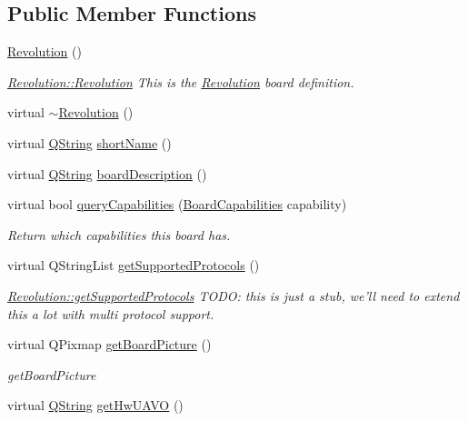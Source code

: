 \subsection*{Public Member Functions}
\begin{DoxyCompactItemize}
\item 
\hyperlink{group___boards___open_pilot_plugin_gad4ecc2008e08f7c54b4fe92215c77bbb}{Revolution} ()
\begin{DoxyCompactList}\small\item\em \hyperlink{group___boards___open_pilot_plugin_gad4ecc2008e08f7c54b4fe92215c77bbb}{Revolution\-::\-Revolution} This is the \hyperlink{class_revolution}{Revolution} board definition. \end{DoxyCompactList}\item 
virtual \hyperlink{group___boards___open_pilot_plugin_ga231a5a6f79ce02a7e05009982fb65d15}{$\sim$\-Revolution} ()
\item 
virtual \hyperlink{group___u_a_v_objects_plugin_gab9d252f49c333c94a72f97ce3105a32d}{Q\-String} \hyperlink{group___boards___open_pilot_plugin_gad4cc3e213b15f56ace6281fe55d94f32}{short\-Name} ()
\item 
virtual \hyperlink{group___u_a_v_objects_plugin_gab9d252f49c333c94a72f97ce3105a32d}{Q\-String} \hyperlink{group___boards___open_pilot_plugin_ga8f2a18257adeeb2cd190e4150cf5cc01}{board\-Description} ()
\item 
virtual bool \hyperlink{group___boards___open_pilot_plugin_gaef49c9e5a2cbbcbce7b6e7ed3867adaf}{query\-Capabilities} (\hyperlink{group___core_plugin_ga01b09218f2a13aaeee6db007ac6bd967}{Board\-Capabilities} capability)
\begin{DoxyCompactList}\small\item\em Return which capabilities this board has. \end{DoxyCompactList}\item 
virtual Q\-String\-List \hyperlink{group___boards___open_pilot_plugin_gaec390e1462c61b4e0d3b433f35159192}{get\-Supported\-Protocols} ()
\begin{DoxyCompactList}\small\item\em \hyperlink{group___boards___open_pilot_plugin_gaec390e1462c61b4e0d3b433f35159192}{Revolution\-::get\-Supported\-Protocols} T\-O\-D\-O\-: this is just a stub, we'll need to extend this a lot with multi protocol support. \end{DoxyCompactList}\item 
virtual Q\-Pixmap \hyperlink{group___boards___open_pilot_plugin_gae5372488eec83623b6aad34593708034}{get\-Board\-Picture} ()
\begin{DoxyCompactList}\small\item\em get\-Board\-Picture \end{DoxyCompactList}\item 
virtual \hyperlink{group___u_a_v_objects_plugin_gab9d252f49c333c94a72f97ce3105a32d}{Q\-String} \hyperlink{group___boards___open_pilot_plugin_ga0a6612a8dd453bde6ec037442d18c7c7}{get\-Hw\-U\-A\-V\-O} ()
\end{DoxyCompactItemize}

